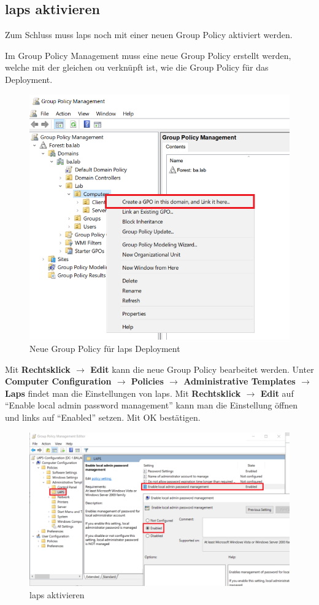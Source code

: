 \subsection{\acrshort{laps} aktivieren}
Zum Schluss muss \acrshort{laps} noch mit einer neuen Group Policy aktiviert werden.

Im Group Policy Management muss eine neue Group Policy erstellt werden, welche mit der gleichen \acrshort{ou} verknüpft ist, wie die Group Policy für das Deployment.
\begin{figure}[H]
    \centering
    \includegraphics[width=0.7\linewidth]{../img/LAPS/GPO-Create-New.png}
    \caption{Neue Group Policy für \acrshort{laps} Deployment}
\end{figure}

Mit \textbf{Rechtsklick $\rightarrow$ Edit} kann die neue Group Policy bearbeitet werden.
Unter \textbf{Computer Configuration $\rightarrow$ Policies $\rightarrow$ Administrative Templates $\rightarrow$ Laps} findet man die Einstellungen von \acrshort{laps}.
Mit \textbf{Rechtsklick $\rightarrow$ Edit} auf ``Enable local admin password management'' kann man die Einstellung öffnen und links auf ``Enabled'' setzen.
Mit OK bestätigen.
\begin{figure}[H]
    \centering
    \includegraphics[width=0.7\linewidth]{../img/LAPS/enable-laps.png}
    \caption{\acrshort{laps} aktivieren}
\end{figure}


